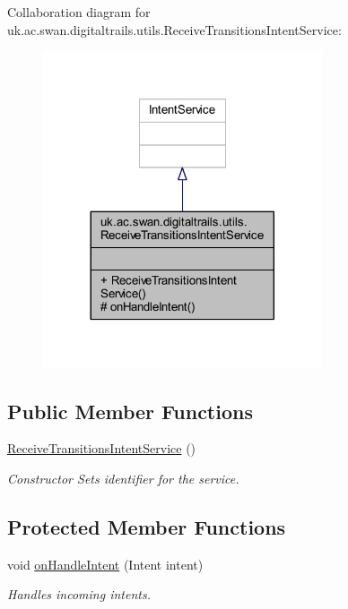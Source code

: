 Collaboration diagram for uk.\+ac.\+swan.\+digitaltrails.\+utils.\+Receive\+Transitions\+Intent\+Service\+:
\nopagebreak
\begin{figure}[H]
\begin{center}
\leavevmode
\includegraphics[width=233pt]{classuk_1_1ac_1_1swan_1_1digitaltrails_1_1utils_1_1_receive_transitions_intent_service__coll__graph}
\end{center}
\end{figure}
\subsection*{Public Member Functions}
\begin{DoxyCompactItemize}
\item 
\hyperlink{classuk_1_1ac_1_1swan_1_1digitaltrails_1_1utils_1_1_receive_transitions_intent_service_a3f8c82bfe917566a8545bd7dd693945d}{Receive\+Transitions\+Intent\+Service} ()
\begin{DoxyCompactList}\small\item\em Constructor Sets identifier for the service. \end{DoxyCompactList}\end{DoxyCompactItemize}
\subsection*{Protected Member Functions}
\begin{DoxyCompactItemize}
\item 
void \hyperlink{classuk_1_1ac_1_1swan_1_1digitaltrails_1_1utils_1_1_receive_transitions_intent_service_a3cd694363233cd8a49028cbc46bf0800}{on\+Handle\+Intent} (Intent intent)
\begin{DoxyCompactList}\small\item\em Handles incoming intents. \end{DoxyCompactList}\end{DoxyCompactItemize}


